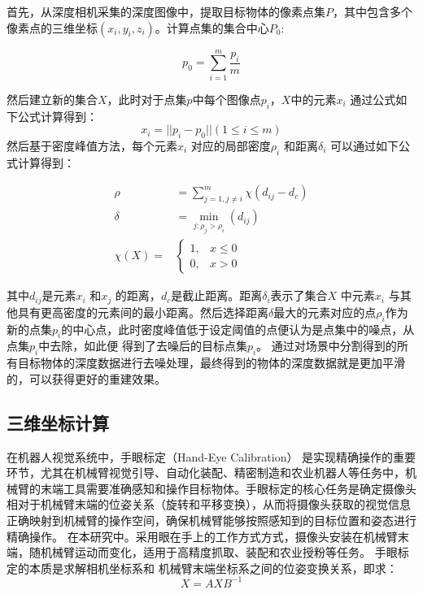 首先，从深度相机采集的深度图像中，提取目标物体的像素点集$P$，其中包含多个像素点的三维坐标$(x_{i},y_{i},z_{i})$。计算点集的集合中心$P_{0}$:

\begin{equation}
	\label{equ:noise}
	p_{0} = \sum_{i=1}^{m}\frac{p_{i}}{m}
\end{equation}

然后建立新的集合$X$，此时对于点集$p$中每个图像点$p_{i}$，$𝑋$中的元素$x_{i}$ 通过公式如下公式计算得到：
\begin{equation}
	\label{equ:noise2}
	x_{i} = || p_{i} - p_{0}|| (1 \le i \le m)
\end{equation}
然后基于密度峰值方法，每个元素$𝑥_{i}$ 对应的局部密度$\rho_{i}$ 和距离$\delta_{i}$ 可以通过如下公式计算得到：

\begin{equation}
	\label{equ:noise3}
	\begin{split}
		\rho &= \sum_{j=1,j \neq i}^{m} \chi(d_{ij} - d_{c}) \\
		\delta &= \min_{j:\rho_{j}>\rho_{i}}(d_{ij}) \\
		\chi(X) = &
		\begin{cases}
			1, & x \le 0 \\
			0, & x > 0
		\end{cases}
	\end{split}
\end{equation}

其中$d_{ij}$是元素$x_{i}$ 和$x_{j}$ 的距离，$d_{c}$是截止距离。距离$\delta_{i}$表示了集合$X$ 中元素$x_{i}$ 与其他具有更高密度的元素间的最小距离。然后选择距离$\delta$最大的元素对应的点$\rho_{i}$作为新的点集$p_{i}$的中心点，此时密度峰值低于设定阈值的点便认为是点集中的噪点，从点集$p_{i}$中去除，如此便
得到了去噪后的目标点集$p_{i}$。
通过对场景中分割得到的所有目标物体的深度数据进行去噪处理，最终得到的物体的深度数据就是更加平滑的，可以获得更好的重建效果。




\subsection{三维坐标计算}
在机器人视觉系统中，手眼标定（Hand-Eye Calibration） 是实现精确操作的重要环节，尤其在机械臂视觉引导、自动化装配、精密制造和农业机器人等任务中，机械臂的末端工具需要准确感知和操作目标物体。手眼标定的核心任务是确定摄像头相对于机械臂末端的位姿关系（旋转和平移变换），从而将摄像头获取的视觉信息正确映射到机械臂的操作空间，确保机械臂能够按照感知到的目标位置和姿态进行精确操作。
在本研究中。采用眼在手上的工作方式方式，摄像头安装在机械臂末端，随机械臂运动而变化，适用于高精度抓取、装配和农业授粉等任务。
手眼标定的本质是求解相机坐标系和 机械臂末端坐标系之间的位姿变换关系，即求：
\begin{equation}
	\label{equ:hand-in-eye}
	X = AXB^{-1}
\end{equation}

